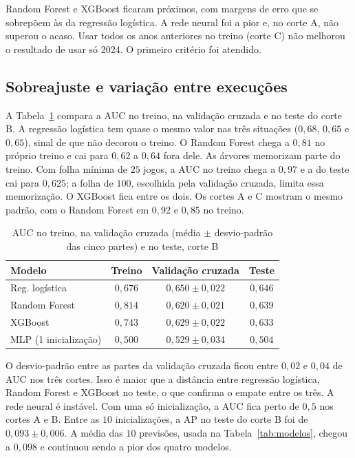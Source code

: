 \documentclass[conference]{IEEEtran}
\begin{document}
Random Forest e XGBoost ficaram próximos, com margens de erro que se sobrepõem às da regressão logística. A rede neural foi a pior e, no corte A, não superou o acaso. Usar todos os anos anteriores no treino (corte C) não melhorou o resultado de usar só 2024. O primeiro critério foi atendido.

\subsection{Sobreajuste e variação entre execuções}

A Tabela~\ref{tab:ajuste} compara a AUC no treino, na validação cruzada e no teste do corte B. A regressão logística tem quase o mesmo valor nas três situações ($0{,}68$, $0{,}65$ e $0{,}65$), sinal de que não decorou o treino. O Random Forest chega a $0{,}81$ no próprio treino e cai para $0{,}62$ a $0{,}64$ fora dele. As árvores memorizam parte do treino. Com folha mínima de $25$ jogos, a AUC no treino chega a $0{,}97$ e a do teste cai para $0{,}625$; a folha de $100$, escolhida pela validação cruzada, limita essa memorização. O XGBoost fica entre os dois. Os cortes A e C mostram o mesmo padrão, com o Random Forest em $0{,}92$ e $0{,}85$ no treino.

\begin{table}[!t]
\caption{AUC no treino, na validação cruzada (média $\pm$ desvio-padrão das cinco partes) e no teste, corte B}
\label{tab:ajuste}
\centering
\begin{tabular}{lccc}
\toprule
Modelo & Treino & Validação cruzada & Teste \\
\midrule
Reg. logística & $0{,}676$ & $0{,}650 \pm 0{,}022$ & $0{,}646$ \\
Random Forest & $0{,}814$ & $0{,}620 \pm 0{,}021$ & $0{,}639$ \\
XGBoost & $0{,}743$ & $0{,}629 \pm 0{,}022$ & $0{,}633$ \\
MLP (1 inicialização) & $0{,}500$ & $0{,}529 \pm 0{,}034$ & $0{,}504$ \\
\bottomrule
\end{tabular}
\end{table}

O desvio-padrão entre as partes da validação cruzada ficou entre $0{,}02$ e $0{,}04$ de AUC nos três cortes. Isso é maior que a distância entre regressão logística, Random Forest e XGBoost no teste, o que confirma o empate entre os três. A rede neural é instável. Com uma só inicialização, a AUC fica perto de $0{,}5$ nos cortes A e B. Entre as $10$ inicializações, a AP no teste do corte B foi de $0{,}093 \pm 0{,}006$. A média das $10$ previsões, usada na Tabela~\ref{tab:modelos}, chegou a $0{,}098$ e continuou sendo a pior dos quatro modelos.
\end{document}
